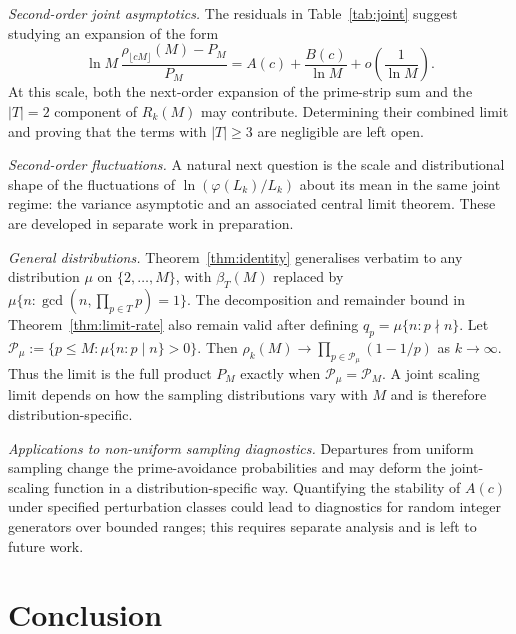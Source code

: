\documentclass[11pt]{article}
\theoremstyle{remark}
\newcommand{\gcdop}{\operatorname{gcd}}
\newcommand{\PM}{\mathcal{P}_M}
\begin{document}
\emph{Second-order joint asymptotics.} The residuals in Table~\ref{tab:joint} suggest studying an expansion of the form
\[
\ln M\,\frac{\rho_{\lfloor cM\rfloor}(M)-P_M}{P_M}
= A(c)+\frac{B(c)}{\ln M}+o\!\left(\frac{1}{\ln M}\right).
\]
At this scale, both the next-order expansion of the prime-strip sum and the $|T|=2$ component of $R_k(M)$ may contribute. Determining their combined limit and proving that the terms with $|T|\geq 3$ are negligible are left open.

\emph{Second-order fluctuations.} A natural next question is the scale and distributional shape of the fluctuations of $\ln(\varphi(L_k)/L_k)$ about its mean in the same joint regime: the variance asymptotic and an associated central limit theorem. These are developed in separate work in preparation.

\emph{General distributions.} Theorem~\ref{thm:identity} generalises verbatim to any distribution $\mu$ on $\{2, \ldots, M\}$, with $\beta_T(M)$ replaced by $\mu\{n:\gcdop(n,\prod_{p\in T}p)=1\}$. The decomposition and remainder bound in Theorem~\ref{thm:limit-rate} also remain valid after defining $q_p=\mu\{n:p\nmid n\}$. Let $\mathcal{P}_{\mu}:=\{p\leq M:\mu\{n:p\mid n\}>0\}$. Then $\rho_k(M)\to\prod_{p\in\mathcal{P}_{\mu}}(1-1/p)$ as $k\to\infty$. Thus the limit is the full product $P_M$ exactly when $\mathcal{P}_{\mu}=\PM$. A joint scaling limit depends on how the sampling distributions vary with $M$ and is therefore distribution-specific.

\emph{Applications to non-uniform sampling diagnostics.} Departures from uniform sampling change the prime-avoidance probabilities and may deform the joint-scaling function in a distribution-specific way. Quantifying the stability of $A(c)$ under specified perturbation classes could lead to diagnostics for random integer generators over bounded ranges; this requires separate analysis and is left to future work.

\section{Conclusion}\label{sec:conclusion}
\end{document}
